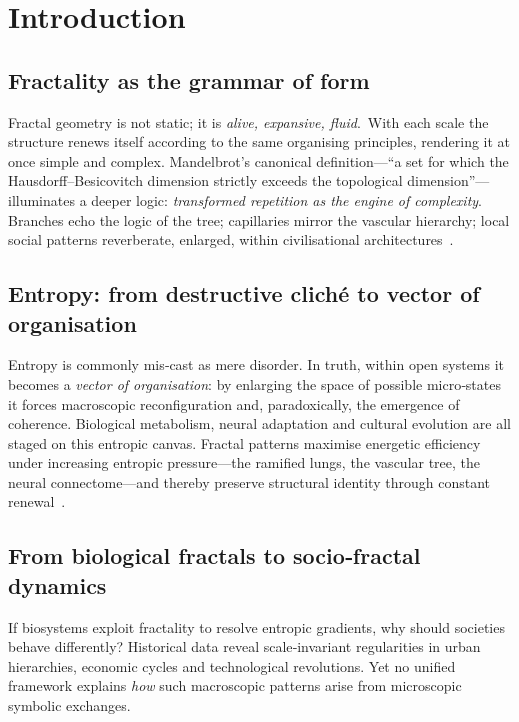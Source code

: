 \section{Introduction}\label{sec:intro}

\subsection{Fractality as the grammar of form}

Fractal geometry is not static; it is \emph{alive, expansive, fluid}. With each scale the structure renews itself according to the same organising principles, rendering it at once simple and complex.\citep{mandelbrot1982}  Mandelbrot’s canonical definition—“a set for which the Hausdorff–Besicovitch dimension strictly exceeds the topological dimension”—illuminates a deeper logic: \emph{transformed repetition as the engine of complexity}.  Branches echo the logic of the tree; capillaries mirror the vascular hierarchy; local social patterns reverberate, enlarged, within civilisational architectures .

\subsection{Entropy: from destructive cliché to vector of organisation}

Entropy is commonly mis‑cast as mere disorder.  In truth, within open systems it becomes a \emph{vector of organisation}: by enlarging the space of possible micro‑states it forces macroscopic reconfiguration and, paradoxically, the emergence of coherence.\citep{schrodinger1944}  Biological metabolism, neural adaptation and cultural evolution are all staged on this entropic canvas.  Fractal patterns maximise energetic efficiency under increasing entropic pressure—the ramified lungs, the vascular tree, the neural connectome—and thereby preserve structural identity through constant renewal .

\subsection{From biological fractals to socio‑fractal dynamics}

If biosystems exploit fractality to resolve entropic gradients, why should societies behave differently?  Historical data reveal scale‑invariant regularities in urban hierarchies, economic cycles and technological revolutions.  Yet no unified framework explains \emph{how} such macroscopic patterns arise from microscopic symbolic exchanges.

